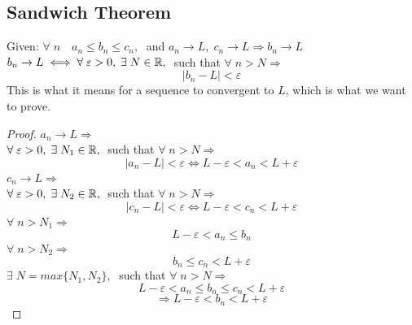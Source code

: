 \subsection{Sandwich Theorem}
Given: $\forall\; n\quad a_n\leq b_n\leq c_n,\;$ and $a_n\rightarrow L,\; c_n\rightarrow L \Longrightarrow b_n\rightarrow L$\\
$b_n\rightarrow L \iff \forall\; \varepsilon>0,\; \exists\; N\in \mathbb{R},\;$ such that $\forall\; n>N \Longrightarrow$
\[
    |b_n-L|<\varepsilon
\]
This is what it means for a sequence to convergent to $L$, which is what we want to prove.\\
\begin{proof}
    $a_n\rightarrow L \Longrightarrow$\\
    $\forall\; \varepsilon>0,\;\exists\; N_1\in \mathbb{R},\;$ such that $\forall\; n>N\Longrightarrow$
    \[
        |a_n-L|<\varepsilon \iff L-\varepsilon<a_n<L+\varepsilon
    \]
    $c_n\rightarrow L \Longrightarrow$\\
    $\forall\; \varepsilon>0,\;\exists\; N_2\in \mathbb{R},\;$ such that $\forall\; n>N\Longrightarrow$
    \[
        |c_n-L|<\varepsilon \iff L-\varepsilon<c_n<L+\varepsilon
    \]
    $\forall\; n>N_1 \Longrightarrow$
    \[
        L-\varepsilon<a_n\leq b_n
    \]
    $\forall\; n>N_2 \Longrightarrow$
    \[
        b_n\leq c_n<L+\varepsilon
    \]
    $\exists\; N=max\{N_1,N_2\},\;$ such that $\forall\; n>N\Longrightarrow$
    \[
        L-\varepsilon<a_n\leq b_n\leq c_n<L+\varepsilon
    \]
    \[
        \Longrightarrow L-\varepsilon<b_n<L+\varepsilon
    \]
\end{proof}
